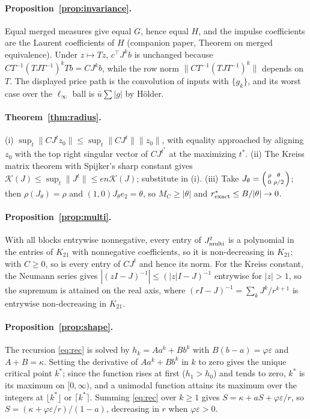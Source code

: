 \paragraph{Proposition~\ref{prop:invariance}.} Equal merged measures give equal $G$, hence equal $H$, and the impulse coefficients are the Laurent coefficients of $H$ (companion paper, Theorem on merged equivalence). Under $z\mapsto Tz$, $c^\top J^kb$ is unchanged because $CT^{-1}(TJT^{-1})^kTb=CJ^kb$, while the row norm $\|CT^{-1}(TJT^{-1})^k\|$ depends on $T$. The displayed price path is the convolution of inputs with $\{g_k\}$, and its worst case over the $\ell_\infty$ ball is $\bar u\sum|g|$ by H\"older.

\paragraph{Theorem~\ref{thm:radius}.} (i) $\sup_t\|CJ^tz_0\|\le\sup_t\|CJ^t\|\|z_0\|$, with equality approached by aligning $z_0$ with the top right singular vector of $CJ^{t^*}$ at the maximizing $t^*$. (ii) The Kreiss matrix theorem with Spijker's sharp constant gives $\mathcal K(J)\le\sup_t\|J^t\|\le en\mathcal K(J)$; substitute in (i). (iii) Take $J_\theta=\begin{psmallmatrix}\rho&\theta\\0&\rho/2\end{psmallmatrix}$; then $\rho(J_\theta)=\rho$ and $(1,0)J_\theta e_2=\theta$, so $M_C\ge|\theta|$ and $r^*_{\rm exact}\le B/|\theta|\to0$.

\paragraph{Proposition~\ref{prop:multi}.} With all blocks entrywise nonnegative, every entry of $J_{\rm multi}^t$ is a polynomial in the entries of $K_{21}$ with nonnegative coefficients, so it is non-decreasing in $K_{21}$; with $C\ge0$, so is every entry of $CJ^t$ and hence its norm. For the Kreiss constant, the Neumann series gives $|(zI-J)^{-1}|\le(|z|I-J)^{-1}$ entrywise for $|z|>1$, so the supremum is attained on the real axis, where $(rI-J)^{-1}=\sum_kJ^k/r^{k+1}$ is entrywise non-decreasing in $K_{21}$.

\paragraph{Proposition~\ref{prop:shape}.} The recursion \eqref{eq:rec} is solved by $h_k=Aa^k+Bb^k$ with $B(b-a)=\varphi\varepsilon$ and $A+B=\kappa$. Setting the derivative of $Aa^k+Bb^k$ in $k$ to zero gives the unique critical point $k^*$; since the function rises at first ($h_1>h_0$) and tends to zero, $k^*$ is its maximum on $[0,\infty)$, and a unimodal function attains its maximum over the integers at $\lfloor k^*\rfloor$ or $\lceil k^*\rceil$. Summing \eqref{eq:rec} over $k\ge1$ gives $S=\kappa+aS+\varphi\varepsilon/r$, so $S=(\kappa+\varphi\varepsilon/r)/(1-a)$, decreasing in $r$ when $\varphi\varepsilon>0$.

